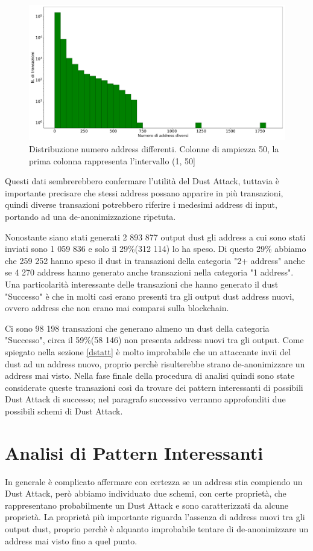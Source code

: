  \begin{figure}[h!]
     \centering
     \includegraphics[scale=0.3]{Grafici/num_addr.pdf}
     \caption{Distribuzione numero address differenti. Colonne di ampiezza 50, la prima colonna rappresenta l'intervallo (1, 50]}
     \label{fig:diff_addr}
 \end{figure}
\FloatBarrier
Questi dati sembrerebbero confermare l'utilità del Dust Attack, tuttavia è importante precisare che stessi address possano apparire in più transazioni, quindi diverse transazioni potrebbero riferire i medesimi address di input, portando ad una de-anonimizzazione ripetuta. 

Nonostante siano stati generati 2 893 877 output dust gli address a cui sono stati inviati sono 1 059 836 e solo il 29\%(312 114) lo ha speso. Di questo 29\% abbiamo che 259 252 hanno speso il dust in transazioni della categoria "2+ address" anche se 4 270 address hanno generato anche transazioni nella categoria "1 address". Una particolarità interessante delle transazioni che hanno generato il dust "Successo" è che in molti casi erano presenti tra gli output dust address nuovi, ovvero address che non erano mai comparsi sulla blockchain. 

Ci sono 98 198 transazioni che generano almeno un dust della categoria "Successo", circa il 59\%(58 146) non presenta address nuovi tra gli output. Come spiegato nella sezione \ref{dstatt} è molto improbabile che un attaccante invii del dust ad un address nuovo, proprio perchè risulterebbe strano de-anonimizzare un address mai visto. Nella fase finale della procedura di analisi quindi sono state considerate queste transazioni così da trovare dei pattern interessanti di possibili Dust Attack di successo; nel paragrafo successivo verranno approfonditi due possibili schemi di Dust Attack.  
\section{Analisi di Pattern Interessanti}
In generale è complicato affermare con certezza se un address stia compiendo un Dust Attack, però abbiamo individuato due schemi, con certe proprietà, che rappresentano probabilmente un Dust Attack e sono caratterizzati da alcune proprietà. La proprietà più importante riguarda l'assenza di address nuovi tra gli output dust, proprio perchè è alquanto improbabile tentare di de-anonimizzare un address mai visto fino a quel punto.

